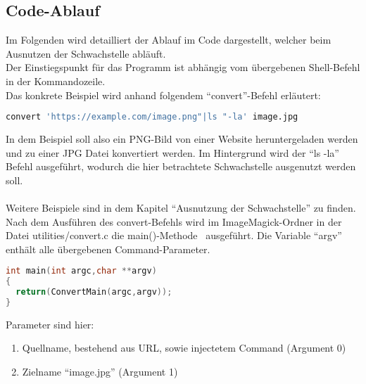 \newpage
\subsection{Code-Ablauf}\label{subsec:code-ablauf}

Im Folgenden wird detailliert der Ablauf im Code dargestellt, welcher beim Ausnutzen der Schwachstelle abläuft.\\

Der Einstiegspunkt für das Programm ist abhängig vom übergebenen Shell-Befehl in der Kommandozeile.\\

Das konkrete Beispiel wird anhand folgendem "`convert"'-Befehl erläutert:

\begin{lstlisting}[language=Bash, caption=Beispielbefehl Codeablauf,label={lst:codeablaufbeispiel}]
convert 'https://example.com/image.png"|ls "-la' image.jpg
\end{lstlisting}
\vspace{5mm}

In dem Beispiel soll also ein PNG-Bild von einer Website heruntergeladen werden und zu einer JPG Datei konvertiert werden.
Im Hintergrund wird der "`ls -la"' Befehl ausgeführt, wodurch die hier betrachtete Schwachstelle ausgenutzt werden soll.\\\\
Weitere Beispiele sind in dem Kapitel "`Ausnutzung der Schwachstelle"' zu finden. \\

Nach dem Ausführen des convert-Befehls wird im ImageMagick-Ordner in der Datei utilities/convert.c die main()-Methode~\cite{DeklarationMain} ausgeführt.
Die Variable "`argv"' enthält alle übergebenen Command-Parameter.\\

\begin{lstlisting}[firstnumber=90, language=C, caption=utilities/convert.c Einstieg main(),label={lst:lstlisting}]
int main(int argc,char **argv)
{
  return(ConvertMain(argc,argv));
}
\end{lstlisting}
\vspace{5mm}

Parameter sind hier:
\begin{enumerate}
  \item Quellname, bestehend aus URL, sowie injectetem Command (Argument 0)
  \item Zielname "`image.jpg"' (Argument 1)
\end{enumerate}

